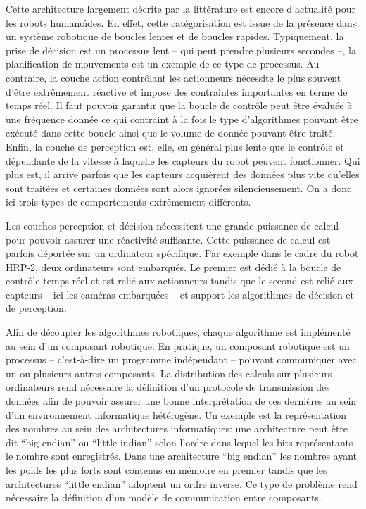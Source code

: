 Cette architecture largement décrite par la littérature est encore
d'actualité pour les robots humanoïdes. En effet, cette catégorisation
est issue de la présence dans un système robotique de boucles lentes
et de boucles rapides. Typiquement, la prise de décision est un
processus lent -- qui peut prendre plusieurs secondes --, la
planification de mouvements est un exemple de ce type de processus. Au
contraire, la couche action contrôlant les actionneurs nécessite le
plus souvent d'être extrêmement réactive et impose des contraintes
importantes en terme de temps réel. Il faut pouvoir garantir que la
boucle de contrôle peut être évaluée à une fréquence donnée ce qui
contraint à la fois le type d'algorithmes pouvant être exécuté dans
cette boucle ainsi que le volume de donnée pouvant être traité. Enfin,
la couche de perception est, elle, en général plus lente que le
contrôle et dépendante de la vitesse à laquelle les capteurs du robot
peuvent fonctionner. Qui plus est, il arrive parfois que les capteurs
acquièrent des données plus vite qu'elles sont traitées et certaines
données sont alors ignorées silencieusement. On a donc ici trois types
de comportements extrêmement différents.


Les couches perception et décision nécessitent une grande puissance de
calcul pour pouvoir assurer une réactivité suffisante. Cette puissance
de calcul est parfois déportée sur un ordinateur spécifique. Par
exemple dans le cadre du robot HRP-2, deux ordinateurs sont
embarqués. Le premier est dédié à la boucle de contrôle temps réel et
est relié aux actionneurs tandis que le second est relié aux capteurs
-- ici les caméras embarquées -- et support les algorithmes de
décision et de perception.


Afin de découpler les algorithmes robotiques, chaque algorithme est
implémenté au sein d'un composant robotique. En pratique, un composant robotique est un processus --
c'est-à-dire un programme indépendant -- pouvant communiquer avec un
ou plusieurs autres composants. La distribution des calculs sur
plusieurs ordinateurs rend nécessaire la définition d'un protocole de
transmission des données afin de pouvoir assurer une bonne
interprétation de ces dernières au sein d'un environnement
informatique hétérogène. Un exemple est la représentation des nombres
au sein des architectures informatiques: une architecture peut être
dit ``big endian'' ou ``little
indian'' selon l'ordre dans lequel
les bits représentants le nombre sont enregistrés. Dans une
architecture ``big endian'' les nombres ayant les poids les plus forts
sont contenus en mémoire en premier tandis que les architectures
``little endian'' adoptent un ordre inverse. Ce type de problème rend
nécessaire la définition d'un modèle de communication entre
composants.


